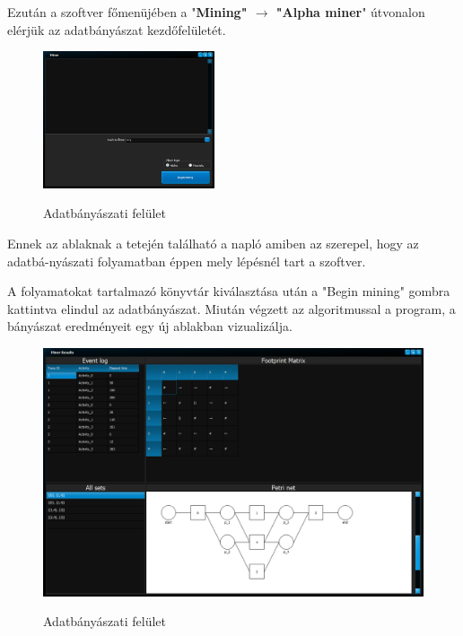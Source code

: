 Ezután a szoftver főmenüjében a "\textbf{Mining" $\rightarrow$ "Alpha miner}" útvonalon elérjük az adatbányászat kezdőfelületét.

\begin{figure}[h!]
	\begin{center}
		\caption{Adatbányászati felület}
		\includegraphics[width=0.45\textwidth, keepaspectratio=true]{images/img_datamining_ui}\\
		\label{fig:example}
	\end{center}
\end{figure}

Ennek az ablaknak a tetején található a napló amiben az szerepel, hogy az adatbá\hyp{}nyászati folyamatban éppen mely lépésnél tart a szoftver.

A folyamatokat tartalmazó könyvtár kiválasztása után a "Begin mining" gombra kattintva elindul az adatbányászat. Miután végzett az algoritmussal a program, a bányászat eredményeit egy új ablakban vizualizálja.

\begin{figure}[h!]
	\begin{center}
		\caption{Adatbányászati felület}
		\includegraphics[width=\textwidth, keepaspectratio=true]{images/img_datamining_results}\\
		\label{fig:example}
	\end{center}
\end{figure}




















